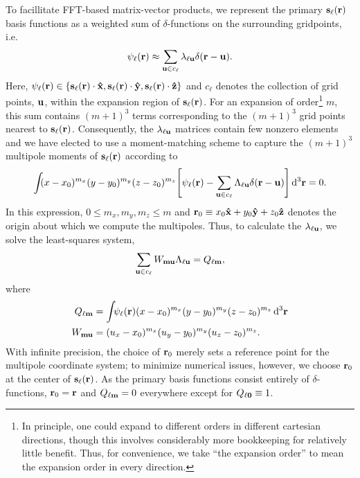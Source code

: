 To facillitate FFT-based matrix-vector products, we represent the primary $\vb{s}_\ell(\vb{r})$ basis functions as a weighted sum of $\delta$-functions on the surrounding gridpoints, i.e.
\begin{equation}
  \psi_\ell(\vb{r}) \approx \sum_{\vb{u} \in c_{\ell}} \lambda_{\ell\vb{u}} \delta(\vb{r} - \vb{u}).
  \label{eq:grid linear combination}
\end{equation}
Here, $\psi_\ell(\vb{r}) \in \qty{\vb{s}_\ell(\vb{r})\cdot \vu{x}, \vb{s}_\ell(\vb{r}) \cdot \vu{y}, \vb{s}_\ell(\vb{r}) \cdot \vu{z}}$ and $c_\ell$ denotes the collection of grid points, $\vb{u}$, within the expansion region of $\vb{s}_\ell(\vb{r})$.
For an expansion of order\footnote{In principle, one could expand to different orders in different cartesian directions, though this involves considerably more bookkeeping for relatively little benefit. Thus, for convenience, we take ``the expansion order'' to mean the expansion order in every direction.} $m$, this sum contains $(m + 1)^3$ terms corresponding to the $(m + 1)^3$ grid points nearest to $\vb{s}_\ell(\vb{r})$.
Consequently, the $\lambda_{\ell \vb{u}}$ matrices contain few nonzero elements and we have elected to use a moment-matching scheme to capture the $(m + 1)^3$ multipole moments of $\vb{s}_\ell(\vb{r})$ according to
\begin{equation}
  \int_{} \kern0.1em (x - x_0)^{m_x}(y - y_0)^{m_y}(z - z_0)^{m_z} \qty[\psi_\ell(\vb{r}) - \sum_{\vb{u} \in c_\ell}\Lambda_{\ell\vb{u}}\delta(\vb{r} - \vb{u})] \dd[3]{\vb{r}} = 0.
  \label{eq:moment matching}
\end{equation}
In this expression, $0 \leqslant m_x, m_y, m_z \leqslant m$ and $\vb{r}_0 \equiv x_0 \vu{x} + y_0 \vu{y} + z_0\vu{z}$ denotes the origin about which we compute the multipoles.
Thus, to calculate the $\lambda_{\ell \vb{u}}$, we solve the least-squares system,
\begin{equation}
  \sum_{\vb{u} \in c_\ell} W_{\vb{m}\vb{u}}\Lambda_{\ell\vb{u}} = Q_{\ell\vb{m}},
  \label{eq:expansion matrix system}
\end{equation}
where
\begin{subequations}
  \begin{align}
    Q_{\ell \vb{m}} &= \int_{} \psi_\ell(\vb{r}) (x - x_0)^{m_x} (y - y_0)^{m_y} (z - z_0)^{m_z} \dd[3]{\vb{r}} \label{eq:q vector}\\
    W_{\vb{m}\vb{u}} &= (u_x - x_0)^{m_x} (u_y - y_0)^{m_y} (u_z - z_0)^{m_z} \label{eq:w matrix}.
  \end{align}
\end{subequations}
With infinite precision, the choice of $\vb{r}_0$ merely sets a reference point for the multipole coordinate system; to minimize numerical issues, however, we choose $\vb{r}_0$ at the center of $\vb{s}_\ell(\vb{r})$.
As the primary basis functions consist entirely of $\delta$-functions, $\vb{r}_0 = \vb{r}$ and $Q_{\ell\vb{m}} = 0$ everywhere except for $Q_{\ell \vb{0}} \equiv 1$.

